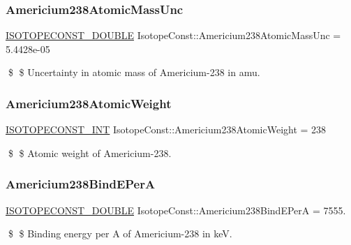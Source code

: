 \subsubsection{\texorpdfstring{Americium238\+Atomic\+Mass\+Unc}{Americium238AtomicMassUnc}}
{\footnotesize\ttfamily \mbox{\hyperlink{group___isotope_const-_macros_ga8f45a7272ce02c0b4c65c44636ed719a}{I\+S\+O\+T\+O\+P\+E\+C\+O\+N\+S\+T\+\_\+\+D\+O\+U\+B\+LE}} Isotope\+Const\+::\+Americium238\+Atomic\+Mass\+Unc = 5.\+4428e-\/05}

\$ \$ Uncertainty in atomic mass of Americium-\/238 in amu. \mbox{\label{group___isotope_const-_americium-_am238_gaab8fb5bebdc0a9f78f2ca303e73b6611}} 
\subsubsection{\texorpdfstring{Americium238\+Atomic\+Weight}{Americium238AtomicWeight}}
{\footnotesize\ttfamily \mbox{\hyperlink{group___isotope_const-_macros_ga5f18360b3e99483a35c32d789e62621c}{I\+S\+O\+T\+O\+P\+E\+C\+O\+N\+S\+T\+\_\+\+I\+NT}} Isotope\+Const\+::\+Americium238\+Atomic\+Weight = 238}

\$ \$ Atomic weight of Americium-\/238. \mbox{\label{group___isotope_const-_americium-_am238_ga358c585ec8cac2252417b10c9fec56bf}} 
\subsubsection{\texorpdfstring{Americium238\+Bind\+E\+PerA}{Americium238BindEPerA}}
{\footnotesize\ttfamily \mbox{\hyperlink{group___isotope_const-_macros_ga8f45a7272ce02c0b4c65c44636ed719a}{I\+S\+O\+T\+O\+P\+E\+C\+O\+N\+S\+T\+\_\+\+D\+O\+U\+B\+LE}} Isotope\+Const\+::\+Americium238\+Bind\+E\+PerA = 7555.}

\$ \$ Binding energy per A of Americium-\/238 in keV. \mbox{\label{group___isotope_const-_americium-_am238_gadb8646ba8810cfaa3ce1c6dfb758d1ba}} 
